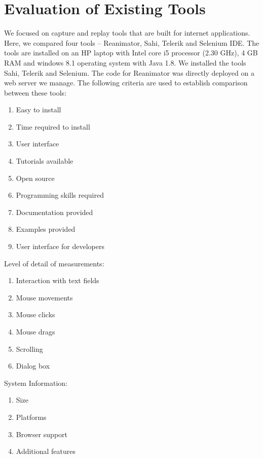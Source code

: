 \documentclass[12pt,journal]{IEEEtran}
\begin{document}
\section{Evaluation of Existing Tools}
We focused on capture and replay tools that are built for internet applications. Here, we compared four tools – Reanimator, Sahi, Telerik and Selenium IDE. The tools are installed on an HP laptop with Intel core i5 processor (2.30 GHz), 4 GB RAM and windows 8.1 operating system with Java 1.8. We installed the tools Sahi, Telerik and Selenium. The code for Reanimator was directly deployed on a web server we manage.
The following criteria are used to establish comparison between these tools:
\begin{enumerate}
\item Easy to install
\item Time required to install
\item User interface
\item Tutorials available
\item Open source
\item Programming skills required
\item Documentation provided
\item Examples provided
\item User interface for developers
\end{enumerate}
Level of detail of measurements:
\begin{enumerate}
\item Interaction with text fields
\item Mouse movements
\item Mouse clicks
\item Mouse drags
\item Scrolling
\item Dialog box
\end{enumerate}
System Information:
\begin{enumerate}
\item Size
\item Platforms
\item Browser support
\item Additional features
\end{enumerate}
\end{document}
